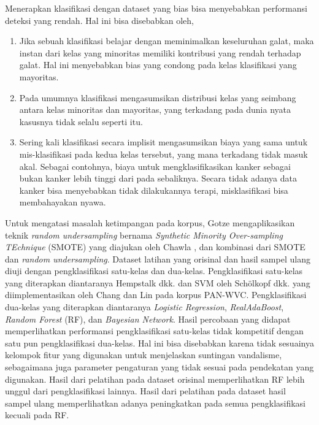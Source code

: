 \newpage
Menerapkan klasifikasi dengan dataset yang bias bisa menyebabkan performansi
deteksi yang rendah.
Hal ini bisa disebabkan oleh,
\begin{enumerate}
	\item Jika sebuah klasifikasi belajar dengan meminimalkan keseluruhan
	galat, maka instan dari kelas yang minoritas memiliki kontribusi yang
	rendah terhadap galat.
	Hal ini menyebabkan bias yang condong pada kelas klasifikasi yang
	mayoritas.
	\item Pada umumnya klasifikasi mengasumsikan distribusi kelas yang
	seimbang antara kelas minoritas dan mayoritas, yang terkadang pada
	dunia nyata kasusnya tidak selalu seperti itu.
	\item Sering kali klasifikasi secara implisit mengasumsikan biaya yang
	sama untuk mis-klasifikasi pada kedua kelas tersebut, yang mana
	terkadang tidak masuk akal.
	Sebagai contohnya, biaya untuk mengklasifikasikan kanker sebagai bukan
	kanker lebih tinggi dari pada sebaliknya.
	Secara tidak adanya data kanker bisa menyebabkan tidak dilakukannya
	terapi, misklasifikasi bisa membahayakan nyawa.
\end{enumerate}

Untuk mengatasi masalah ketimpangan pada korpus, Gotze
\cite{gotze2014advanced}
mengaplikasikan teknik
\textit{random undersampling}
bernama
\textit{Synthetic Minority Over-sampling TEchnique} (SMOTE)
yang diajukan oleh Chawla
\cite{chawla2002smote},
dan kombinasi dari SMOTE dan
\textit{random undersampling}.
Dataset latihan yang orisinal dan hasil sampel ulang diuji dengan
pengklasifikasi satu-kelas dan dua-kelas.
Pengklasifikasi satu-kelas yang diterapkan diantaranya Hempstalk dkk.
\cite{hempstalk2008one}
dan SVM oleh Schölkopf dkk.
\cite{scholkopf1999support}
yang diimplementasikan oleh Chang dan Lin
\cite{chang2011libsvm}
pada korpus PAN-WVC.
Pengklasifikasi dua-kelas yang diterapkan diantaranya
\textit{Logistic Regression},
\textit{RealAdaBoost},
\textit{Random Forest} (RF), dan
\textit{Bayesian Network}.
Hasil percobaan yang didapat memperlihatkan performansi pengklasifikasi
satu-kelas tidak kompetitif dengan satu pun pengklasifikasi dua-kelas.
Hal ini bisa disebabkan karena tidak sesuainya kelompok fitur yang digunakan
untuk menjelaskan suntingan vandalisme, sebagaimana juga parameter pengaturan
yang tidak sesuai pada pendekatan yang digunakan.
Hasil dari pelatihan pada dataset orisinal memperlihatkan RF
lebih unggul dari pengklasifikasi lainnya.
Hasil dari pelatihan pada dataset hasil sampel ulang memperlihatkan adanya
peningkatkan pada semua pengklasifikasi kecuali pada RF.


